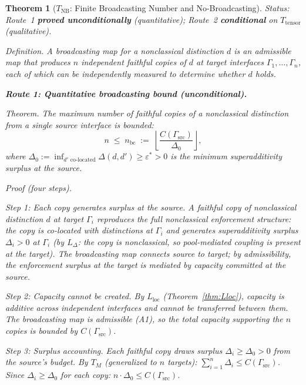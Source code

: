 \documentclass[11pt,a4paper]{article}
\newtheorem{theorem}{Theorem}[section]
\theoremstyle{definition}
\newcommand{\eps}{\varepsilon}
\begin{document}
\begin{theorem}[$T_{\mathrm{NB}}$: Finite Broadcasting Number and No-Broadcasting]\label{thm:TNB}
\textit{Status: Route~1 \textbf{proved unconditionally} (quantitative); Route~2 \textbf{conditional} on $T_{\mathrm{tensor}}$ (qualitative).}

\textit{Definition.}  A \emph{broadcasting map} for a nonclassical distinction $d$ is an admissible map that produces $n$ independent faithful copies of $d$ at target interfaces $\Gamma_1, \ldots, \Gamma_n$, each of which can be independently measured to determine whether $d$ holds.

\medskip\noindent\textbf{Route 1: Quantitative broadcasting bound (unconditional).}

\smallskip\noindent\textit{Theorem.}  The maximum number of faithful copies of a nonclassical distinction from a single source interface is bounded:
\[
n \;\le\; n_{\mathrm{bc}} \;:=\; \left\lfloor \frac{C(\Gamma_{\mathrm{src}})}{\Delta_0} \right\rfloor,
\]
where $\Delta_0 := \inf_{d' \text{ co-located}} \Delta(d, d') \ge \eps^* > 0$ is the minimum superadditivity surplus at the source.

\smallskip\noindent\textit{Proof} (four steps).

\textit{Step 1: Each copy generates surplus at the source.}  A faithful copy of nonclassical distinction $d$ at target $\Gamma_i$ reproduces the full nonclassical enforcement structure: the copy is co-located with distinctions at $\Gamma_i$ and generates superadditivity surplus $\Delta_i > 0$ at $\Gamma_i$ (by $L_\Delta$: the copy is nonclassical, so pool-mediated coupling is present at the target).  The broadcasting map connects source to target; by admissibility, the enforcement surplus at the target is mediated by capacity committed at the source.

\textit{Step 2: Capacity cannot be created.}  By $L_{\mathrm{loc}}$ (Theorem~\ref{thm:Lloc}), capacity is additive across independent interfaces and cannot be transferred between them.  The broadcasting map is admissible (A1), so the total capacity supporting the $n$ copies is bounded by $C(\Gamma_{\mathrm{src}})$.

\textit{Step 3: Surplus accounting.}  Each faithful copy draws surplus $\Delta_i \ge \Delta_0 > 0$ from the source's budget.  By $T_M$ (generalized to $n$ targets): $\sum_{i=1}^n \Delta_i \le C(\Gamma_{\mathrm{src}})$.  Since $\Delta_i \ge \Delta_0$ for each copy: $n \cdot \Delta_0 \le C(\Gamma_{\mathrm{src}})$.


\end{theorem}
\end{document}
